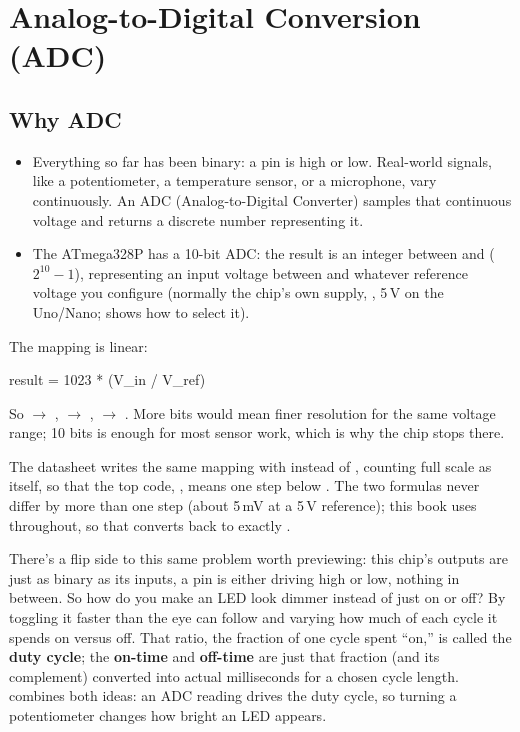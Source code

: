 
\section{Analog-to-Digital Conversion (ADC)}
\label{c4:sec:adc}\label{c4:app:a}

\subsection{Why ADC}
\label{c4:a:1}
\begin{itemize}
  \item Everything so far has been binary: a pin is high or low. Real-world signals, like a
    potentiometer, a temperature sensor, or a microphone, vary continuously. An ADC
    (Analog-to-Digital Converter) samples that continuous voltage and returns a discrete number
    representing it.
  \item The ATmega328P has a 10-bit ADC: the result is an integer between  and 
    ($2^{10} - 1$), representing an input voltage between  and whatever reference voltage
    you configure (normally the chip's own supply, , 5\,V on the Uno/Nano;
     shows how to select it).
\end{itemize}
The mapping is linear:

\begin{console}
result = 1023 * (V_in / V_ref)
\end{console}

\noindent So  $\rightarrow$ ,  $\rightarrow$
,  $\rightarrow$ . More bits would mean finer
resolution for the same voltage range; 10 bits is enough for most sensor work, which is why the
chip stops there.

The datasheet writes the same mapping with  instead of , counting full scale
as  itself, so that the top code, , means one step below . The
two formulas never differ by more than one step (about 5\,mV at a 5\,V reference); this book uses
 throughout, so that  converts back to exactly .

There's a flip side to this same problem worth previewing: this chip's outputs are just as binary
as its inputs, a pin is either driving high or low, nothing in between. So how do you make an LED
look dimmer instead of just on or off? By toggling it faster than the eye can follow and varying
how much of each cycle it spends on versus off. That ratio, the fraction of one cycle spent ``on,''
is called the \textbf{duty cycle}; the \textbf{on-time} and \textbf{off-time} are just that
fraction (and its complement) converted into actual milliseconds for a chosen cycle length.
 combines both ideas: an ADC reading drives the duty cycle, so turning a
potentiometer changes how bright an LED appears.

